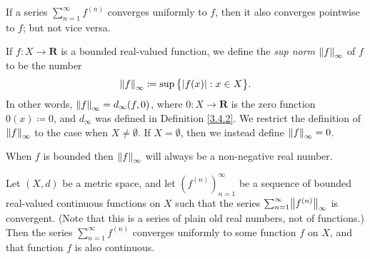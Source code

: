 \begin{note}
    If a series \(\sum_{n = 1}^\infty f^{(n)}\) converges uniformly to \(f\), then it also converges pointwise to \(f\);
    but not vice versa.
\end{note}

\setcounter{theorem}{4}
\begin{definition}\label{3.5.5}
    If \(f : X \to \mathbf{R}\) is a bounded real-valued function, we define the \emph{sup norm} \(\norm*{f}_\infty\) of \(f\) to be the number
    \[
        \norm*{f}_\infty \coloneqq \sup\big\{\abs*{f(x)} : x \in X\big\}.
    \]
    In other words, \(\norm*{f}_\infty = d_\infty(f, 0)\), where \(0 : X \to \mathbf{R}\) is the zero function \(0(x) \coloneqq 0\), and \(d_\infty\) was defined in Definition \ref{3.4.2}.
    We restrict the definition of \(\norm*{f}_\infty\) to the case when \(X \neq \emptyset\).
    If \(X = \emptyset\), then we instead define \(\norm*{f}_\infty = 0\).
\end{definition}

\begin{note}
    When \(f\) is bounded then \(\norm*{f}_\infty\) will always be a non-negative real number.
\end{note}

\setcounter{theorem}{6}
\begin{theorem}\label{3.5.7}
    Let \((X, d)\) be a metric space, and let \((f^{(n)})_{n = 1}^\infty\) be a sequence of bounded real-valued continuous functions on \(X\) such that the series \(\sum_{n = 1}^\infty \norm*{f^{(n)}}_\infty\) is convergent.
    (Note that this is a series of plain old real numbers, not of functions.)
    Then the series \(\sum_{n = 1}^\infty f^{(n)}\) converges uniformly to some function \(f\) on \(X\), and that function \(f\) is also continuous.
\end{theorem}

